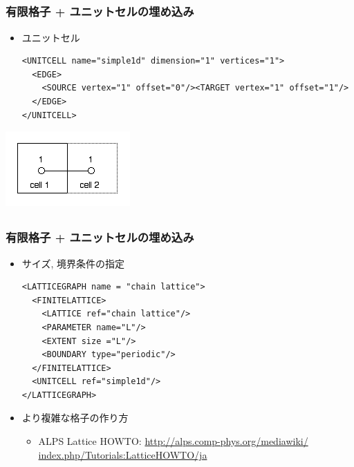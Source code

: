 \subsection*{\redm\whiteb\greenb}
\begin{frame}[t, fragile]
  \frametitle{有限格子 + ユニットセルの埋め込み}
  \begin{itemize}
  \item ユニットセル
  \begin{lstlisting}
<UNITCELL name="simple1d" dimension="1" vertices="1">
  <EDGE>
    <SOURCE vertex="1" offset="0"/><TARGET vertex="1" offset="1"/>
  </EDGE>
</UNITCELL>
\end{lstlisting}
  \end{itemize}
  \begin{center}
    \includegraphics[height=0.25\textheight]{TutorialLatticeHOWTOLatticegraph3}
  \end{center}
\end{frame}

\subsection*{\redm\whiteb\greenb}
\begin{frame}[t,fragile]
  \frametitle{有限格子 + ユニットセルの埋め込み}
  \begin{itemize}
  \item サイズ, 境界条件の指定
    \begin{lstlisting}
<LATTICEGRAPH name = "chain lattice">
  <FINITELATTICE>
    <LATTICE ref="chain lattice"/>
    <PARAMETER name="L"/>
    <EXTENT size ="L"/>
    <BOUNDARY type="periodic"/>
  </FINITELATTICE>
  <UNITCELL ref="simple1d"/>
</LATTICEGRAPH>
\end{lstlisting}
  \item より複雑な格子の作り方
    \begin{itemize}
    \item ALPS Lattice HOWTO: {\small \href{http://alps.comp-phys.org/mediawiki/index.php/Tutorials:LatticeHOWTO/ja}{http://alps.comp-phys.org/mediawiki/ index.php/Tutorials:LatticeHOWTO/ja}}
    \end{itemize}
  \end{itemize}
\end{frame}

